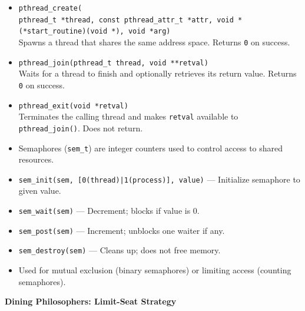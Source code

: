 \documentclass[8pt,twocolumn]{article}
\begin{document}
\begin{itemize}[leftmargin=2em]
    \setlength{\itemsep}{0pt} %
    \setlength{\parskip}{0pt}
    \item \texttt{pthread\_create(\\ pthread\_t *thread, const pthread\_attr\_t *attr, void *(*start\_routine)(void *), void *arg)} \\
    Spawns a thread that shares the same address space. Returns \texttt{0} on success.

    \item \texttt{pthread\_join(pthread\_t thread, void **retval)} \\
    Waits for a thread to finish and optionally retrieves its return value. Returns \texttt{0} on success.

    \item \texttt{pthread\_exit(void *retval)} \\
    Terminates the calling thread and makes \texttt{retval} available to \texttt{pthread\_join()}. Does not return.
    \item Semaphores (\texttt{sem\_t}) are integer counters used to control access to shared resources.
    \item \texttt{sem\_init(sem, [0(thread)|1(process)], value)} — Initialize semaphore to given value.
    \item \texttt{sem\_wait(sem)} — Decrement; blocks if value is 0.
    \item \texttt{sem\_post(sem)} — Increment; unblocks one waiter if any.
    \item \texttt{sem\_destroy(sem)} — Cleans up; does not free memory.
    \item Used for mutual exclusion (binary semaphores) or limiting access (counting semaphores).
\end{itemize}
\vspace{-0.6em}
\textbf{Dining Philosophers: Limit-Seat Strategy}
\vspace{-0.6em}
\end{document}

